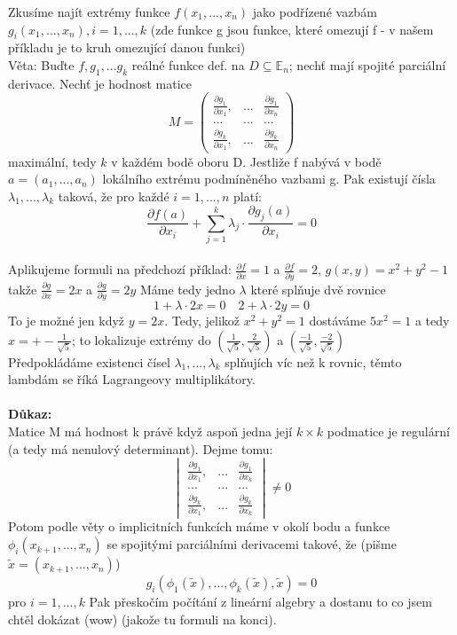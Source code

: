 \documentclass{article}
\begin{document}
Zkusíme najít extrémy funkce $f(x_{1},...,x_{n})$ jako podřízené vazbám $g_{i}(x_{1},...,x_{n}),
i = 1,...,k$ (zde funkce g jsou funkce, které omezují f - v našem příkladu je to kruh
omezující danou funkci)\\
Věta: Buďte $f,g_{1},...g_{k}$ reálné funkce def. na $D \subseteq \mathbb{E}_{n}$; 
nechť mají spojité parciální derivace. Nechť je hodnost matice
$$M = \begin{pmatrix}
    \frac{\partial g_{1}}{\partial x_{1}}, & ... & \frac{\partial g_{1}}{\partial x_{n}}\\
    ... & ... & ...\\
    \frac{\partial g_{k}}{\partial x_{1}}, & ... & \frac{\partial g_{k}}{\partial x_{n}}
\end{pmatrix}$$
maximální, tedy $k$ v každém bodě oboru D. Jestliže f nabývá v bodě $a = (a_{1},...,a_{n})$
lokálního extrému podmíněného vazbami g. 
Pak existují čísla $\lambda_{1}, ..., \lambda_{k}$ taková, že pro každé $i=1,...,n$ platí:
$$\frac{\partial f(a)}{\partial x_{i}} + \sum_{j=1}^{k}\lambda_{j} \cdot \frac{\partial g_{j}(a)}{\partial x_{i}} = 0$$\\
Aplikujeme formuli na předchozí příklad:
$\frac{\partial f}{\partial x} = 1$ a $\frac{\partial f}{\partial y} = 2$, $g(x,y) = x^{2}+y^{2}-1$
takže $\frac{\partial g}{\partial x} = 2x$ a $\frac{\partial g}{\partial y} = 2y$ 
Máme tedy jedno $\lambda$ které splňuje dvě rovnice
$$ 1 + \lambda \cdot 2x = 0 \quad 2 + \lambda \cdot 2y = 0$$
To je možné jen když $y = 2x$. Tedy, jelikož $x^{2} + y^{2} = 1$ dostáváme $5x^{2} = 1$
a tedy $x = +-\frac{1}{\sqrt{5}}$; to lokalizuje extrémy do $(\frac{1}{\sqrt{5}}, \frac{2}{\sqrt{5}})$
a $(\frac{-1}{\sqrt{5}},\frac{-2}{\sqrt{5}})$\\
Předpokládáme existenci čísel $\lambda_{1}, ..., \lambda_{k}$ splňujích víc než k rovnic,
těmto lambdám se říká Lagrangeovy multiplikátory.\\\\

\textbf{Důkaz:}\\
Matice M má hodnost k právě když aspoň jedna její $k\times k$ podmatice je regulární
(a tedy má nenulový determinant). Dejme tomu:
$$
\begin{vmatrix}
    \frac{\partial g_{1}}{\partial x_{1}}, & ... & \frac{\partial g_{1}}{\partial x_{k}}\\
    ... & ... & ...\\
    \frac{\partial g_{k}}{\partial x_{1}}, & ... & \frac{\partial g_{k}}{\partial x_{k}}
\end{vmatrix} \neq 0
$$
Potom podle věty o implicitních funkcích máme v okolí bodu a funkce $\phi_{i}(x_{k+1},...,x_{n})$
se spojitými parciálními derivacemi takové, že (pišme $\tilde{x} = (x_{k+1},...,x_{n})$)
$$g_{i}(\phi_{1}(\tilde{x}), ..., \phi_{k}(\tilde{x}), \tilde{x}) = 0$$ pro $i = 1,...,k$
Pak přeskočím počítání z lineární algebry a dostanu to co jsem chtěl dokázat (wow) 
(jakože tu formuli na konci).\\\\
\end{document}
